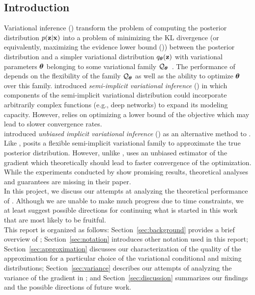 \documentclass[10pt]{article}
\begin{document}
\subsection{Introduction} \label{sec:introduction}

Variational inference (\vi) transform the problem of computing the posterior distribution $p(\mathbf{z}|\mathbf{x})$ into a problem of minimizing the KL divergence (or equivalently, maximizing the evidence lower bound (\elbo)) between the posterior distribution and a simpler variational distribution $q_{\bm{\theta}}(\mathbf{z})$ with variational parameters ${\bm{\theta}}$ belonging to some variational family $\mathcal{Q}_{\bm{\theta}}$~\citep{Jordan:1999}. The performance of \vi depends on the flexibility of the family $\mathcal{Q}_{\bm{\theta}}$ as well as the ability to optimize ${\bm{\theta}}$ over this family. \citet{Yin:2018} introduced \textit{semi-implicit variational inference} (\sivi) in which components of the semi-implicit variational distribution could incorporate arbitrarily complex functions (e.g., deep networks) to expand its modeling capacity. However, \sivi relies on optimizing a lower bound of the \elbo objective which may lead to slower convergence rates.
\\

\citet{Titsias:2019} introduced \textit{unbiased implicit variational inference} (\uivi) as an alternative method to \sivi. Like \sivi, \uivi posits a flexible semi-implicit variational family to approximate the true posterior distribution. However, unlike \sivi, \uivi uses an unbiased estimator of the \elbo gradient which theoretically should lead to faster convergence of the optimization. While the experiments conducted by \citet{Titsias:2019} show promising results, theoretical analyses and guarantees are missing in their paper.
\\

In this project, we discuss our attempts at analyzing the theoretical performance of \uivi. Although we are unable to make much progress due to time constraints, we at least suggest possible directions for continuing what is started in this work that are most likely to be fruitful. \todo
\\

This report is organized as follows: Section~\ref{sec:background} provides a brief overview of \uivi; Section~\ref{sec:notation} introduces other notation used in this report; Section~\ref{sec:approximation} discusses our characterization of the quality of the \uivi approximation for a particular choice of the variational conditional and mixing distributions; Section~\ref{sec:variance} describes our attempts of analyzing the variance of the \elbo gradient in \uivi; and Section~\ref{sec:discussion} summarizes our findings and the possible directions of future work.
\end{document}
